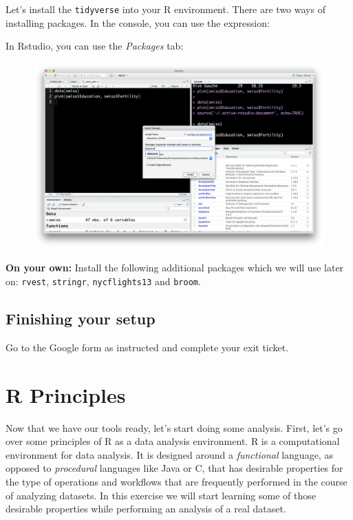 \documentclass[]{article}
\theoremstyle{definition}
\theoremstyle{definition}
\theoremstyle{remark}
\begin{document}
Let's install the \texttt{tidyverse} into your R environment. There are
two ways of installing packages. In the console, you can use the
expression:

In Rstudio, you can use the \emph{Packages} tab:

\begin{figure}[htbp]
\centering
\includegraphics{img/rstudio_install_packages.png}
\caption{}
\end{figure}

\textbf{On your own:} Install the following additional packages which we
will use later on: \texttt{rvest}, \texttt{stringr},
\texttt{nycflights13} and \texttt{broom}.

\subsection{Finishing your setup}\label{finishing-your-setup}

Go to the Google form as instructed and complete your exit ticket.

\section{R Principles}\label{r-principles}

Now that we have our tools ready, let's start doing some analysis.
First, let's go over some principles of R as a data analysis
environment. R is a computational environment for data analysis. It is
designed around a \emph{functional} language, as opposed to
\emph{procedural} languages like Java or C, that has desirable
properties for the type of operations and workflows that are frequently
performed in the course of analyzing datasets. In this exercise we will
start learning some of those desirable properties while performing an
analysis of a real dataset.
\end{document}
